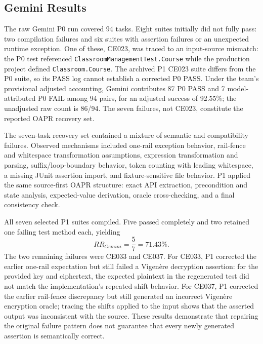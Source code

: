 \documentclass[conference]{IEEEtran}
\begin{document}
\subsection{Gemini Results}
The raw Gemini P0 run covered 94 tasks. Eight suites initially did not fully pass: two compilation failures and six suites with assertion failures or an unexpected runtime exception. One of these, CE023, was traced to an input-source mismatch: the P0 test referenced \texttt{ClassroomManagementTest.Course} while the production project defined \texttt{Classroom.Course}. The archived P1 CE023 suite differs from the P0 suite, so its PASS log cannot establish a corrected P0 PASS. Under the team's provisional adjusted accounting, Gemini contributes 87 P0 PASS and 7 model-attributed P0 FAIL among 94 pairs, for an adjusted success of 92.55\%; the unadjusted raw count is 86/94. The seven failures, not CE023, constitute the reported OAPR recovery set.

The seven-task recovery set contained a mixture of semantic and compatibility failures. Observed mechanisms included one-rail exception behavior, rail-fence and whitespace transformation assumptions, expression transformation and parsing, suffix/loop-boundary behavior, token counting with leading whitespace, a missing JUnit assertion import, and fixture-sensitive file behavior. P1 applied the same source-first OAPR structure: exact API extraction, precondition and state analysis, expected-value derivation, oracle cross-checking, and a final consistency check.

All seven selected P1 suites compiled. Five passed completely and two retained one failing test method each, yielding
\begin{equation}
RR_{Gemini}=\frac{5}{7}=71.43\%.
\end{equation}
The two remaining failures were CE033 and CE037. For CE033, P1 corrected the earlier one-rail expectation but still failed a Vigen\`ere decryption assertion: for the provided key and ciphertext, the expected plaintext in the regenerated test did not match the implementation's repeated-shift behavior. For CE037, P1 corrected the earlier rail-fence discrepancy but still generated an incorrect Vigen\`ere encryption oracle; tracing the shifts applied to the input shows that the asserted output was inconsistent with the source. These results demonstrate that repairing the original failure pattern does not guarantee that every newly generated assertion is semantically correct.
\end{document}
